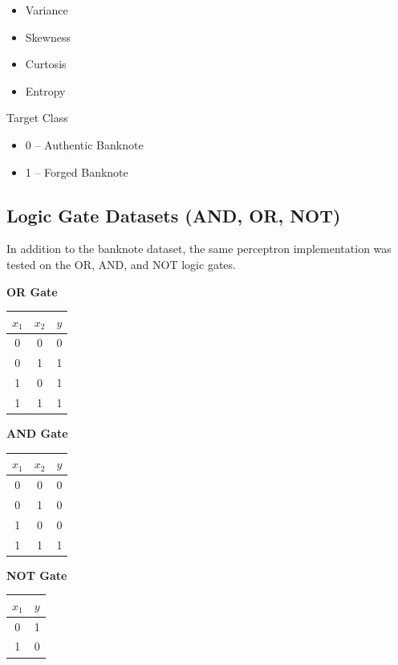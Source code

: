 \documentclass[11pt,a4paper]{article}
\begin{document}
\begin{itemize}
\item Variance
\item Skewness
\item Curtosis
\item Entropy
\end{itemize}

Target Class

\begin{itemize}
\item 0 -- Authentic Banknote
\item 1 -- Forged Banknote
\end{itemize}

\subsection*{Logic Gate Datasets (AND, OR, NOT)}


In addition to the banknote dataset, the same perceptron implementation was tested on the OR, AND, and NOT logic gates.

\textbf{OR Gate}

\begin{center}
\begin{tabular}{|c|c|c|}
\hline
$x_1$ & $x_2$ & $y$\\
\hline
0 & 0 & 0\\
0 & 1 & 1\\
1 & 0 & 1\\
1 & 1 & 1\\
\hline
\end{tabular}
\end{center}

\textbf{AND Gate}

\begin{center}
\begin{tabular}{|c|c|c|}
\hline
$x_1$ & $x_2$ & $y$\\
\hline
0 & 0 & 0\\
0 & 1 & 0\\
1 & 0 & 0\\
1 & 1 & 1\\
\hline
\end{tabular}
\end{center}

\textbf{NOT Gate}

\begin{center}
\begin{tabular}{|c|c|}
\hline
$x_1$ & $y$\\
\hline
0 & 1\\
1 & 0\\
\hline
\end{tabular}
\end{center}
\end{document}
